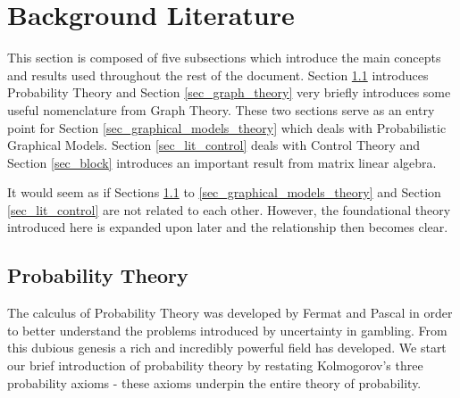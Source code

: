 \section{Background Literature}
This section is composed of five subsections which introduce the main concepts and results used throughout the rest of the document. Section \ref{sec_prob_theory} introduces Probability Theory and Section \ref{sec_graph_theory} very briefly introduces some useful nomenclature from Graph Theory. These two sections serve as an entry point for Section \ref{sec_graphical_models_theory} which deals with Probabilistic Graphical Models. Section \ref{sec_lit_control} deals with Control Theory and Section \ref{sec_block} introduces an important result from matrix linear algebra.

It would seem as if Sections \ref{sec_prob_theory} to \ref{sec_graphical_models_theory} and Section \ref{sec_lit_control} are not related to each other. However, the foundational theory introduced here is expanded upon later and the relationship then becomes clear.

\subsection{Probability Theory}
\label{sec_prob_theory}
The calculus of Probability Theory was developed by Fermat and Pascal in order to better understand the problems introduced by uncertainty in gambling. From this dubious genesis a rich and incredibly powerful field has developed. We start our brief introduction of probability theory by restating Kolmogorov's three probability axioms - these axioms underpin the entire theory of probability.

